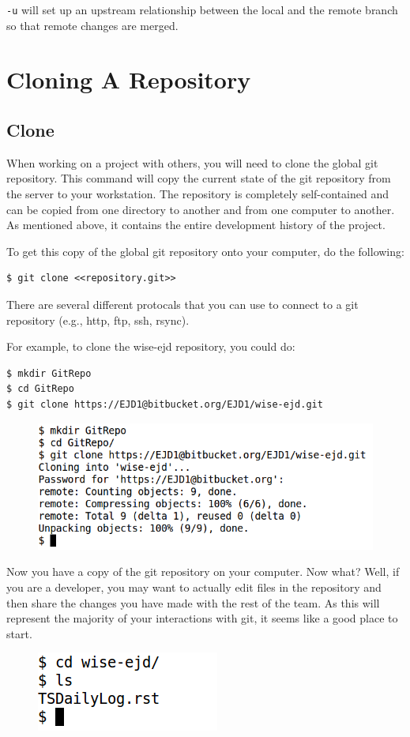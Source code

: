 \documentclass[11pt,a4paper]{article}
\begin{document}
\texttt{-u} will set up an upstream relationship between the local and the remote branch so that remote changes are merged.

\section*{Cloning A Repository}
\subsection*{Clone}
When working on a project with others, you will need to clone the global git repository. This command will copy the current state of the git repository from the server to your workstation. The repository is completely self-contained and can be copied from one directory to another and from one computer to another. As
mentioned above, it contains the entire development history of the project. 

To get this copy of the global git repository onto your computer, do the following:
\begin{verbatim}
$ git clone <<repository.git>>
\end{verbatim}
There are several different protocals that you can use to connect to a git repository (e.g., http, ftp, ssh, rsync).

For example, to clone the wise-ejd repository, you could do:
\begin{verbatim}
$ mkdir GitRepo
$ cd GitRepo
$ git clone https://EJD1@bitbucket.org/EJD1/wise-ejd.git
\end{verbatim}
\begin{figure}[H]
    \begin{center}
        \includegraphics[scale=0.5]{clone.png}       
       \end{center}
    \end{figure}
Now you have a copy of the git repository on your computer. Now what? Well, if you are a developer, you may want to actually edit files in the repository and then share the changes you have made with the rest of the team. As this will represent the majority of your interactions with git, it seems like a good place to start.
\begin{figure}[H]
    \begin{center}
        \includegraphics[scale=0.5]{repo-contents.png}       
       \end{center}
    \end{figure}
\end{document}
